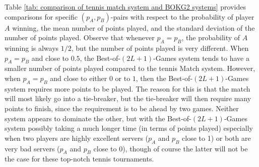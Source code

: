 \documentclass[11pt]{article}
\theoremstyle{plain}
\theoremstyle{definition}
\begin{document}
Table \ref{tab: comparison of tennis match system and BOKG2 systems} provides comparisons for specific $(p_A,p_B)$-pairs with respect to the probability of player $A$ winning, the mean number of points played, and the standard deviation of the number of points played. Observe that whenever $p_A=p_B$, the probability of $A$ winning is always $1/2$, but the number of points played is very different. When $p_A=p_B$ and close to $0.5$, the Best-of-$(2L+1)$-Games system tends to have a smaller number of points played compared to the tennis Match system. However, when $p_A=p_B$ and close to either $0$ or to $1$, then the Best-of-$(2L+1)$-Games system requires more points to be played. The reason for this is that the match will most likely go into a tie-breaker, but the tie-breaker will then require many points to finish, since the requirement is to be ahead by two games. Neither system appears to dominate the other, but with the Best-of-$(2L+1)$-Games system possibly taking a much longer time (in terms of points played) especially when two players are highly excellent servers ($p_A$ and $p_B$ close to 1) or both are very bad servers ($p_A$ and $p_B$ close to 0), though of course the latter will not be the case for these top-notch tennis tournaments.
\end{document}
